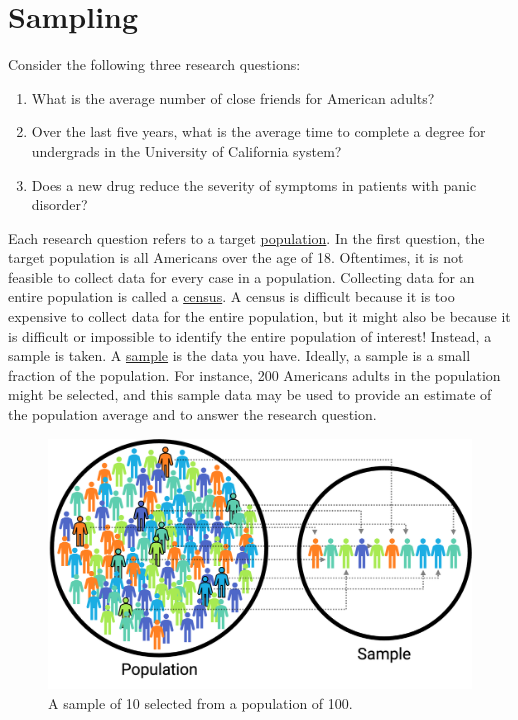 \documentclass[
]{krantz}
\providecommand{\tightlist}{%
  \setlength{\itemsep}{0pt}\setlength{\parskip}{0pt}}
\begin{document}
\hypertarget{sampling}{%
\chapter{Sampling}\label{sampling}}

Consider the following three research questions:

\begin{enumerate}
\def\labelenumi{\arabic{enumi}.}
\tightlist
\item
  What is the average number of close friends for American adults?
\item
  Over the last five years, what is the average time to complete a degree for undergrads in the University of California system?
\item
  Does a new drug reduce the severity of symptoms in patients with panic disorder?
\end{enumerate}

Each research question refers to a target \protect\hyperlink{population-1}{population}. In the first question, the target population is all Americans over the age of 18. Oftentimes, it is not feasible to collect data for every case in a population. Collecting data for an entire population is called a \protect\hyperlink{census}{census}. A census is difficult because it is too expensive to collect data for the entire population, but it might also be because it is difficult or impossible to identify the entire population of interest! Instead, a sample is taken. A \protect\hyperlink{sample-1}{sample} is the data you have. Ideally, a sample is a small fraction of the population. For instance, 200 Americans adults in the population might be selected, and this sample data may be used to provide an estimate of the population average and to answer the research question.

\begin{figure}

{\centering \includegraphics[width=0.6\linewidth]{images/sampling/sampling} 

}

\caption{A sample of 10 selected from a population of 100.}\label{fig:sampling}
\end{figure}
\end{document}
